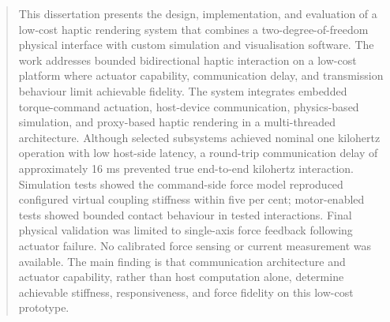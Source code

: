 \providecommand{\uomtoc}{\tableofcontents}
\tableofcontents


\begin{abstract} %
This dissertation presents the design, implementation, and evaluation of a low-cost haptic rendering system that combines a two-degree-of-freedom physical interface with custom simulation and visualisation software. The work addresses bounded bidirectional haptic interaction on a low-cost platform where actuator capability, communication delay, and transmission behaviour limit achievable fidelity. The system integrates embedded torque-command actuation, host-device communication, physics-based simulation, and proxy-based haptic rendering in a multi-threaded architecture. Although selected subsystems achieved nominal one kilohertz operation with low host-side latency, a round-trip communication delay of approximately 16 ms prevented true end-to-end kilohertz interaction. Simulation tests showed the command-side force model reproduced configured virtual coupling stiffness within five per cent; motor-enabled tests showed bounded contact behaviour in tested interactions. Final physical validation was limited to single-axis force feedback following actuator failure. No calibrated force sensing or current measurement was available. The main finding is that communication architecture and actuator capability, rather than host computation alone, determine achievable stiffness, responsiveness, and force fidelity on this low-cost prototype.
\end{abstract}%
\clearpage



\begin{uomoriginality}
	\uomoriginalitydeclaration
\end{uomoriginality}
\uomcopyrightstatement



